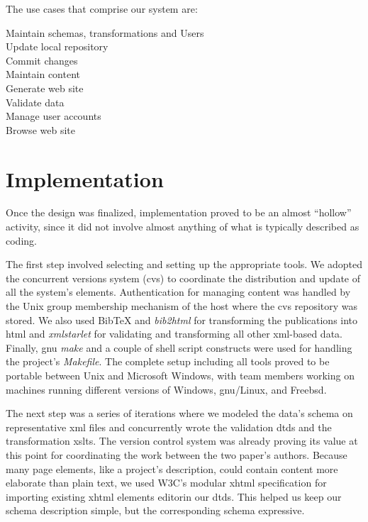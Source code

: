 \documentclass[10pt]{article}
\begin{document}
The use cases that comprise our system are:

\begin{description}
\item[Maintain schemas, transformations and Users]

\item[Update local repository]

\item[Commit changes]

\item[Maintain content]

\item[Generate web site]

\item[Validate data]

\item[Manage user accounts]

\item[Browse web site]

\end{description}

\section{Implementation}
Once the design was finalized,
implementation proved to be an almost ``hollow'' activity,
since it did not involve almost anything of what
is typically described as coding.

The first step involved selecting and setting up the
appropriate tools.
We adopted the concurrent versions system
({\sc cvs}) \cite{BF01} to coordinate the distribution
and update of all the system's elements.
Authentication for managing content was handled by the
Unix group membership mechanism of the host where the
{\sc cvs} repository was stored.
We also used
BibTeX and {\em bib2html} for transforming the publications
into {\sc html} and
{\em xmlstarlet} for validating and transforming
all other {\sc xml}-based data.
Finally, {\sc gnu} {\em make} and a couple of shell script
constructs were used for handling the project's {\em Makefile}.
The complete setup including all tools proved to be portable
between Unix and Microsoft Windows, with team members working
on machines running different versions of Windows, {\sc gnu}/Linux,
and Free{\sc bsd}.

The next step was a series of iterations where we
modeled the data's schema on representative {\sc xml}
files and concurrently wrote the validation {\sc dtd}s
and the transformation {\sc xslt}s.
The version control system was already proving its value
at this point
for coordinating the work between the two paper's authors.
Because many page elements, like a project's description,
could contain content more elaborate than plain text,
we used W3C's modular {\sc xhtml} specification for
importing existing {\sc xhtml} elements editorin our {\sc dtd}s.
This helped us keep our schema description simple,
but the corresponding schema expressive.
\end{document}
